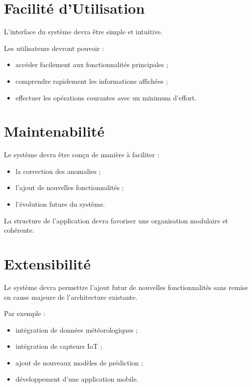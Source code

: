 \documentclass[12pt,a4paper]{report}
\begin{document}
\section{Facilité d'Utilisation}\label{facilituxe9-dutilisation}

L'interface du système devra être simple et intuitive.

Les utilisateurs devront pouvoir :

\begin{itemize}
\item
  accéder facilement aux fonctionnalités principales ;
\item
  comprendre rapidement les informations affichées ;
\item
  effectuer les opérations courantes avec un minimum d'effort.
\end{itemize}

\section{Maintenabilité}\label{maintenabilituxe9}

Le système devra être conçu de manière à faciliter :

\begin{itemize}
\item
  la correction des anomalies ;
\item
  l'ajout de nouvelles fonctionnalités ;
\item
  l'évolution future du système.
\end{itemize}

La structure de l'application devra favoriser une organisation modulaire
et cohérente.

\section{Extensibilité}\label{extensibilituxe9}

Le système devra permettre l'ajout futur de nouvelles fonctionnalités
sans remise en cause majeure de l'architecture existante.

Par exemple :

\begin{itemize}
\item
  intégration de données météorologiques ;
\item
  intégration de capteurs IoT ;
\item
  ajout de nouveaux modèles de prédiction ;
\item
  développement d'une application mobile.
\end{itemize}
\end{document}
